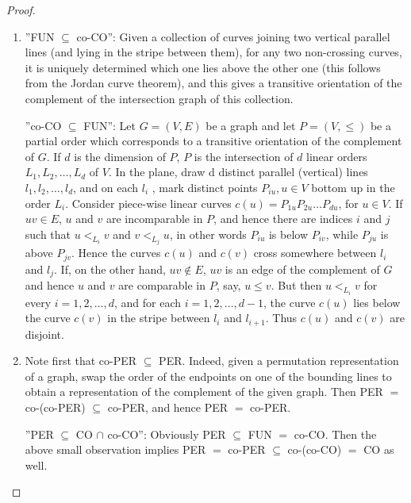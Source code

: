 \begin{proof}
	\begin{enumerate}
		\item ”FUN $\subseteq$ co-CO”: Given a collection of curves joining two vertical parallel lines (and lying in the stripe between them), for any two non-crossing curves, it is uniquely determined which one lies above the other one (this follows from the Jordan curve theorem), and this gives a transitive orientation of the complement of the intersection graph of this collection.
		
		”co-CO $\subseteq$ FUN”: Let $G = (V, E)$ be a graph and let $P = (V, \leq)$ be a partial order which corresponds to a transitive orientation of the complement of $G$. If $d$ is the dimension of $P$, $P$ is the intersection of $d$ linear orders $L_1, L_2 , \dots, L_d$ of $V$. In the plane, draw d distinct parallel (vertical) lines $l_1, l_2, \dots, l_d$, and on each $l_i$ , mark distinct points $P_{iu}, u \in V$ bottom up in the order $L_i$. Consider piece-wise linear curves $c(u) = P_{1u} P_{2u} \dots P_{du}$, for $u \in V$. If $uv \in E$, $u$ and $v$ are incomparable in $P$,	and hence there are indices $i$ and $j$ such that $u <_{L_i} v$ and $v <_{L_j} u$, in other words $P_{iu}$ is below $P_{iv}$, while $P_{ju}$ is above $P_{jv}$. Hence the curves $c(u)$ and $c(v)$ cross somewhere between $l_i$ and $l_j$. If, on the other hand, $uv \notin E$, $uv$ is an edge of the complement of $G$ and hence $u$ and $v$ are comparable in $P$, say, $u \leq v$. But then $u <_{L_i} v$ for every $i = 1, 2, \dots, d$, and for each $i = 1, 2, \dots, d - 1$, the curve $c(u)$	lies below the curve $c(v)$ in the stripe between $l_i$ and $l_{i+1}$. Thus $c(u)$ and $c(v)$ are disjoint.
		
		\item Note first that co-PER $\subseteq$ PER. Indeed, given a permutation representation of a graph, swap	the order of the endpoints on one of the bounding lines to obtain a representation of the complement of the given graph. Then PER $=$ co-(co-PER) $\subseteq$ co-PER, and hence PER $=$ co-PER.
		
		”PER $\subseteq$ CO $\cap$ co-CO”: Obviously PER $\subseteq$ FUN $=$ co-CO. Then the above small observation implies PER $=$ co-PER $\subseteq$ co-(co-CO) $=$ CO as well.


\end{enumerate}
\end{proof}
